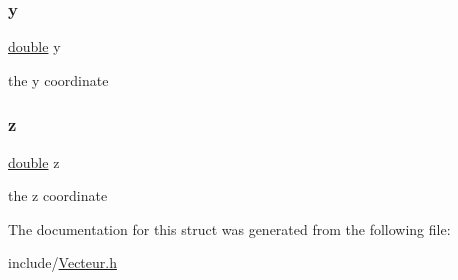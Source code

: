 \subsubsection{\texorpdfstring{y}{y}}
{\footnotesize\ttfamily \hyperlink{g3x__transfo_8h_a89b2b23e407882a535d835574a7912e1}{double} y}

the y coordinate \mbox{\label{struct_vecteur_ab3e6ed577a7c669c19de1f9c1b46c872}} 
\subsubsection{\texorpdfstring{z}{z}}
{\footnotesize\ttfamily \hyperlink{g3x__transfo_8h_a89b2b23e407882a535d835574a7912e1}{double} z}

the z coordinate 

The documentation for this struct was generated from the following file\+:\begin{DoxyCompactItemize}
\item 
include/\hyperlink{_vecteur_8h}{Vecteur.\+h}\end{DoxyCompactItemize}
